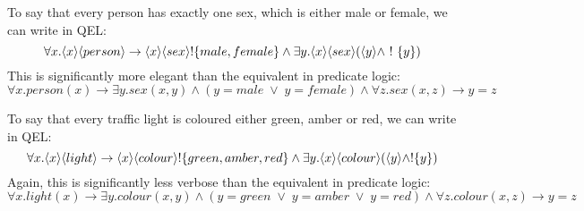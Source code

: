 To say that every person has exactly one sex, which is either male or female, we can write in QEL:
\[
\forall x . \langle x \rangle \langle person \rangle \rightarrow \langle x \rangle \langle sex \rangle ! \{male, female\} \land \exists y . \langle x \rangle \langle sex \rangle (\langle y \rangle \land \ ! \  \{y\})
\]
This is significantly more elegant than the equivalent in predicate logic:
\[
\forall x. person(x) \rightarrow \exists y . sex(x,y) \land (y = male \; \lor \; y = female) \land \forall z . sex(x,z) \rightarrow y = z
\]

To say that every traffic light is coloured either green, amber or red, we can write in QEL:
\[
\forall x. \langle x \rangle \langle light \rangle \rightarrow \langle x \rangle \langle colour \rangle !\{green, amber, red\} \land \exists y . \langle x \rangle \langle colour \rangle (\langle y \rangle \land !\{y\})
\]
Again, this is significantly less verbose than the equivalent in predicate logic:
\[
\forall x. light(x) \rightarrow \exists y . colour(x,y) \land (y = green \; \lor \; y = amber \; \lor \; y = red) \land \forall z . colour(x,z) \rightarrow y = z
\]


